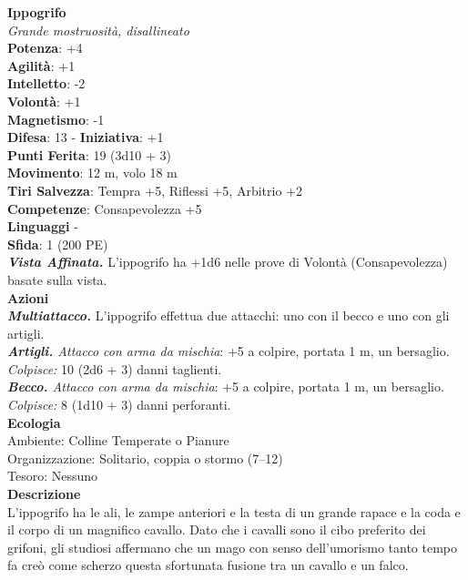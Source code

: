 \begin{multicols}{2}
\medskip\textbf{Ippogrifo}\\
\emph{Grande mostruosità, disallineato}\\
\textbf{Potenza}: +4\\
\textbf{Agilità}: +1\\
\textbf{Intelletto}: -2\\
\textbf{Volontà}: +1\\
\textbf{Magnetismo}: -1\\
\textbf{Difesa}: 13 - \textbf{Iniziativa}: +1\\
\textbf{Punti Ferita}: 19 (3d10 + 3)\\
\textbf{Movimento}: 12 m, volo 18 m\\
\textbf{Tiri Salvezza}: Tempra +5, Riflessi +5, Arbitrio +2\\
\textbf{Competenze}: Consapevolezza +5\\
\textbf{Linguaggi} -\\
\textbf{Sfida}: 1 (200 PE)\smallskip\\
\emph{\textbf{Vista Affinata.}} L'ippogrifo ha +1d6 nelle prove di Volontà (Consapevolezza) basate sulla vista.\\
\smallskip\textbf{Azioni}\\
\emph{\textbf{Multiattacco.}} L'ippogrifo effettua due attacchi: uno con il becco e uno con gli artigli.\\
\emph{\textbf{Artigli.} Attacco con arma da mischia}: +5 a colpire, portata 1 m, un bersaglio.\\
\emph{Colpisce:} 10 (2d6 + 3) danni taglienti.\\
\emph{\textbf{Becco.} Attacco con arma da mischia}: +5 a colpire, portata 1 m, un bersaglio.\\
\emph{Colpisce:} 8 (1d10 + 3) danni perforanti. \\
\textbf{Ecologia}\\
Ambiente: Colline Temperate o Pianure\\
Organizzazione: Solitario, coppia o stormo (7–12)\\
Tesoro: Nessuno\\
\textbf{Descrizione}\\
L’ippogrifo ha le ali, le zampe anteriori e la testa di un grande rapace e la coda e il corpo di un magnifico cavallo. Dato che i cavalli sono il cibo preferito dei grifoni, gli studiosi affermano che un mago con senso dell’umorismo tanto tempo fa creò come scherzo questa sfortunata fusione tra un cavallo e un falco.\\


\end{multicols}
